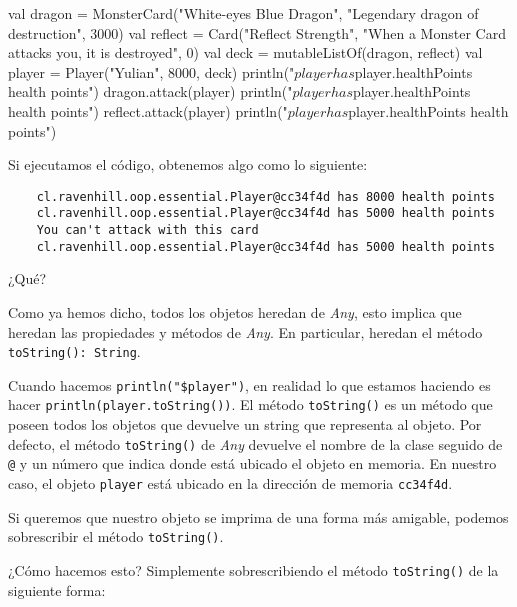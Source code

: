   \begin{kotlin}
    val dragon = MonsterCard("White-eyes Blue Dragon", "Legendary dragon of destruction", 3000)
    val reflect = Card("Reflect Strength", "When a Monster Card attacks you, it is destroyed", 0)
    val deck = mutableListOf(dragon, reflect)
    val player = Player("Yulian", 8000, deck)
    println("$player has ${player.healthPoints} health points")
    dragon.attack(player)
    println("$player has ${player.healthPoints} health points")
    reflect.attack(player)
    println("$player has ${player.healthPoints} health points")
  \end{kotlin}

  Si ejecutamos el código, obtenemos algo como lo siguiente:

  \begin{verbatim}
    cl.ravenhill.oop.essential.Player@cc34f4d has 8000 health points
    cl.ravenhill.oop.essential.Player@cc34f4d has 5000 health points
    You can't attack with this card
    cl.ravenhill.oop.essential.Player@cc34f4d has 5000 health points
  \end{verbatim}

  \begin{center}
    ¿Qué?
  \end{center}

  Como ya hemos dicho, todos los objetos heredan de \textit{Any}, esto implica que heredan las 
  propiedades y métodos de \textit{Any}.
  En particular, heredan el método \texttt{toString(): String}.

  Cuando hacemos \texttt{println("\$player")}, en realidad lo que estamos haciendo es hacer 
  \texttt{println(player.toString())}.
  El método \texttt{toString()} es un método que poseen todos los objetos que devuelve un string
  que representa al objeto.
  Por defecto, el método \texttt{toString()} de \textit{Any} devuelve el nombre de la clase seguido
  de \texttt{@} y un número que indica donde está ubicado el objeto en memoria.
  En nuestro caso, el objeto \texttt{player} está ubicado en la dirección de memoria 
  \texttt{cc34f4d}.

  \begin{defaultbox}
    Si queremos que nuestro objeto se imprima de una forma más amigable, podemos sobrescribir el
    método \texttt{toString()}.
  \end{defaultbox}

  ¿Cómo hacemos esto?
  Simplemente sobrescribiendo el método \texttt{toString()} de la siguiente forma:

